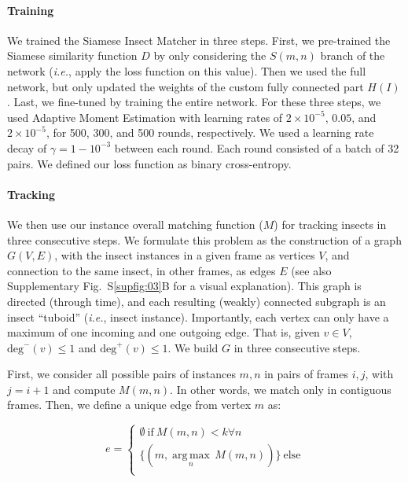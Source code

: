 \documentclass[fleqn,10pt]{wlscirep}
\begin{document}
\paragraph{Training}
We trained the Siamese Insect Matcher in three steps. First, we pre-trained the Siamese similarity function $D$ by only considering the $S(m,n)$ branch of the network (\emph{i.e.}, apply the loss function on this value). Then we used the full network, but only updated the weights of the custom fully connected part $H(I)$. Last, we fine-tuned by training the entire network. For these three steps, we used Adaptive Moment Estimation with learning rates of $2\times{}10^{-5}$, $0.05$, and $2\times{}10^{-5}$, for 500, 300, and 500 rounds, respectively. We used a learning rate decay of $\gamma = 1- 10^{-3}$ between each round. Each round consisted of a batch of 32 pairs. We defined our loss function as binary cross-entropy.

\paragraph{Tracking}
We then use our instance overall matching function ($M$) for tracking insects in three consecutive steps. We formulate this problem as the construction of a graph $G(V, E)$, with the insect instances in a given frame as vertices $V$, and connection to the same insect, in other frames, as edges $E$ (see also Supplementary Fig.~S\ref{supfig:03}B for a visual explanation). This graph is directed (through time), and each resulting (weakly) connected subgraph is an insect “tuboid” (\emph{i.e.}, insect instance). Importantly, each vertex can only have a maximum of one incoming and one outgoing edge. That is, given $v \in V$, $\text{deg}^-(v) \le 1$ and $\text{deg}^+(v) \le 1$. We build $G$ in three consecutive steps. 

First, we consider all possible pairs of instances $m, n$ in pairs of frames $i, j$, with $j=i+1$ and compute $M(m,n)$. In other words, we match only in contiguous frames. Then, we define a unique edge from vertex $m$ as:

\begin{equation}
	\label{eq:01}
	e = \begin{cases}
	\emptyset~\text{if}~M(m,n)<k \forall n \\
	\{(m, \underset{n}{\operatorname{arg\,max}}\,M(m,n))\}~\text{else} \\
	\end{cases}
\end{equation}
\end{document}
